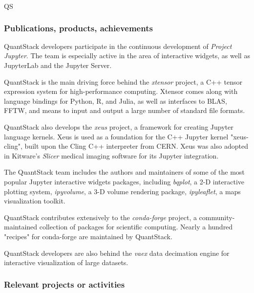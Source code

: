 \begin{sitedescription}{QS}
\subsubsection*{Publications, products, achievements}

\begin{compactenum}

\item QuantStack developers participate in the continuous development of \emph{Project Jupyter}. The team is especially active in the area of interactive widgets, as well as JupyterLab and the Jupyter Server.

\item QuantStack is the main driving force behind the \emph{xtensor} project, a C++ tensor expression system for high-performance computing. Xtensor comes along with language bindings for Python, R, and Julia, as well as interfaces to BLAS, FFTW, and means to input and output a large number of standard file formats.

\item QuantStack also develops the \emph{xeus} project, a framework for creating Jupyter language kernels. Xeus is used as a foundation for the C++ Jupyter kernel "xeus-cling", built upon the Cling C++ interpreter from CERN. Xeus was also adopted in Kitware's \emph{Slicer} medical imaging software for its Jupyter integration.

\item The QuantStack team includes the authors and maintainers of some of the most popular Jupyter interactive widgets packages, including \emph{bqplot}, a 2-D interactive plotting system, \emph{ipyvolume}, a 3-D volume rendering package, \emph{ipyleaflet}, a maps visualization toolkit.

\item QuantStack contributes extensively to the \emph{conda-forge} project, a community-maintained collection of packages for scientific computing. Nearly a hundred "recipes" for conda-forge are maintained by QuantStack.

\item QuantStack developers are also behind the \emph{vaex} data decimation engine for interactive visualization of large datasets.

\end{compactenum}

\subsubsection*{Relevant projects or activities}


\end{sitedescription}

